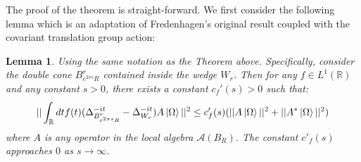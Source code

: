 \documentclass[a4paper,11pt]{article}
\newtheorem{lemma}[theorem]{Lemma}
\theoremstyle{definition}
\begin{document}
The proof of the theorem is straight-forward. We first consider the following lemma which is an adaptation of Fredenhagen's original result \cite{fredenhagen} coupled with the covariant translation group action:
\begin{lemma}\label{lemma:extensionfredenhagen}
    Using the same notation as the Theorem above. Specifically, consider the double cone $B^r_{e^{2\pi s}R}$ contained inside the wedge $W_r$. Then for any $f\in L^1(\mathbb{R})$ and any constant $s > 0$, there exists a constant $c_f'(s) > 0$ such that:
    \begin{equation}
        ||\int_\mathbb{R} dt f(t) (\Delta^{-it}_{B^r_{e^{2\pi s}R}} - \Delta_{W_r}^{-it})A\ket{\Omega}||^2 \leq c'_f(s)(||A\ket{\Omega}||^2 + ||A^*\ket{\Omega}||^2)
    \end{equation}
    where $A$ is any operator in the local algebra $\mathcal{A}(B_R)$. The constant $c'_f(s)$ approaches $0$ as $s\rightarrow \infty$.
\end{lemma}
\end{document}
